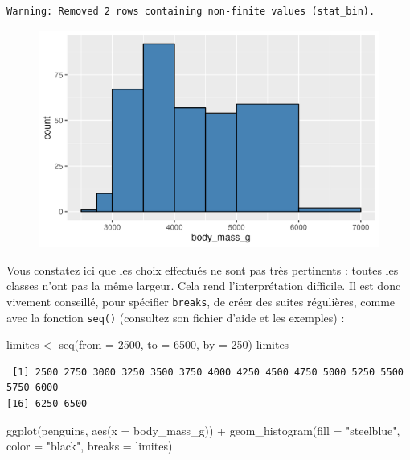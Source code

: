 \documentclass[
  letterpaper,
  DIV=11,
  numbers=noendperiod]{scrreprt}
\newenvironment{Shaded}{\begin{snugshade}}{\end{snugshade}}
\newcommand{\AttributeTok}[1]{\textcolor[rgb]{0.40,0.45,0.13}{#1}}
\newcommand{\DecValTok}[1]{\textcolor[rgb]{0.68,0.00,0.00}{#1}}
\newcommand{\FunctionTok}[1]{\textcolor[rgb]{0.28,0.35,0.67}{#1}}
\newcommand{\NormalTok}[1]{\textcolor[rgb]{0.00,0.23,0.31}{#1}}
\newcommand{\OtherTok}[1]{\textcolor[rgb]{0.00,0.23,0.31}{#1}}
\newcommand{\SpecialCharTok}[1]{\textcolor[rgb]{0.37,0.37,0.37}{#1}}
\newcommand{\StringTok}[1]{\textcolor[rgb]{0.13,0.47,0.30}{#1}}
\begin{document}
\begin{verbatim}
Warning: Removed 2 rows containing non-finite values (stat_bin).
\end{verbatim}

\begin{figure}[H]

{\centering \includegraphics{./03-visualization_files/figure-pdf/unnamed-chunk-17-1.png}

}

\end{figure}

Vous constatez ici que les choix effectués ne sont pas très pertinents :
toutes les classes n'ont pas la même largeur. Cela rend l'interprétation
difficile. Il est donc vivement conseillé, pour spécifier
\texttt{breaks}, de créer des suites régulières, comme avec la fonction
\texttt{seq()} (consultez son fichier d'aide et les exemples) :

\begin{Shaded}
\begin{Highlighting}[]
\NormalTok{limites }\OtherTok{\textless{}{-}} \FunctionTok{seq}\NormalTok{(}\AttributeTok{from =} \DecValTok{2500}\NormalTok{, }\AttributeTok{to =} \DecValTok{6500}\NormalTok{, }\AttributeTok{by =} \DecValTok{250}\NormalTok{)}
\NormalTok{limites}
\end{Highlighting}
\end{Shaded}

\begin{verbatim}
 [1] 2500 2750 3000 3250 3500 3750 4000 4250 4500 4750 5000 5250 5500 5750 6000
[16] 6250 6500
\end{verbatim}

\begin{Shaded}
\begin{Highlighting}[]
\FunctionTok{ggplot}\NormalTok{(penguins, }\FunctionTok{aes}\NormalTok{(}\AttributeTok{x =}\NormalTok{ body\_mass\_g)) }\SpecialCharTok{+}
  \FunctionTok{geom\_histogram}\NormalTok{(}\AttributeTok{fill =} \StringTok{"steelblue"}\NormalTok{, }\AttributeTok{color =} \StringTok{"black"}\NormalTok{,}
                 \AttributeTok{breaks =}\NormalTok{ limites)}
\end{Highlighting}
\end{Shaded}
\end{document}
